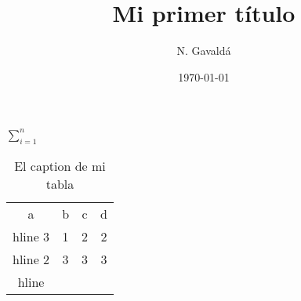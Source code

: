 \documentclass[a4paper, 10pt]{article}
\title{Mi primer título}
\author{N. Gavaldá}
\date{\today}
\begin{document}
	
\maketitle

$\displaystyle\sum_{i=1}^{n}$

\begin{table}
	\begin{center}
		\begin{tabular}[h!]
			{c|c|c|c}
			a & b & c & d \\hline
			3 & 1 & 2 & 2 \\hline
			2 & 3 & 3 & 3 \\hline
		\end{tabular}
		\caption{El caption de mi tabla}
	\end{center}
\end{table}	


	
	
\end{document}
